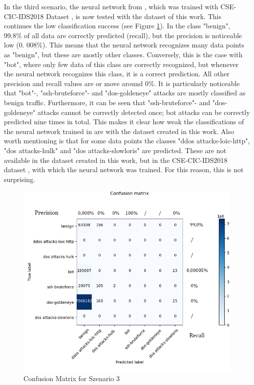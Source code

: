 \documentclass[conference]{IEEEtran}
\begin{document}
In the third scenario, the neural network from \cite{max1}, which was trained with CSE-CIC-IDS2018 Dataset \cite{max2}, is now tested with the dataset of this work. This continues the low classification success (see Figure \ref{fig:cm3}). In the class "benign", 99.8\% of all data are correctly predicted (recall), but the precision is noticeable low (0. 008\%). This means that the neural network recognizes many data points as "benign", but these are mostly other classes. Conversely, this is the case with "bot", where only few data of this class are correctly recognized, but whenever the neural network recognizes this class, it is a correct prediction. All other precision and recall values are or move around 0\%. It is particularly noticeable that "bot"-, "ssh-bruteforce"- and "dos-goldeneye" attacks are mostly classified as benign traffic. Furthermore, it can be seen that "ssh-bruteforce"- and "dos-goldeneye" attacks cannot be correctly detected once; bot attacks can be correctly predicted nine times in total. This makes it clear how weak the classifications of the neural network trained in \cite{max1} are with the dataset created in this work. Also worth mentioning is that for some data points the classes "ddos attacks-loic-http", "dos attacks-hulk" and "dos attacks-slowloris" are predicted. These are not available in the dataset created in this work, but in the CSE-CIC-IDS2018 dataset \cite{max2}, with which the neural network was trained. For this reason, this is not surprising.

\begin{figure}[htbp]  
\centerline{\includegraphics[scale=0.65]{AltesModellNeueDaten.png}}
\caption{Confusion Matrix for Szenario 3}
\label{fig:cm3}
\end{figure}
\end{document}
